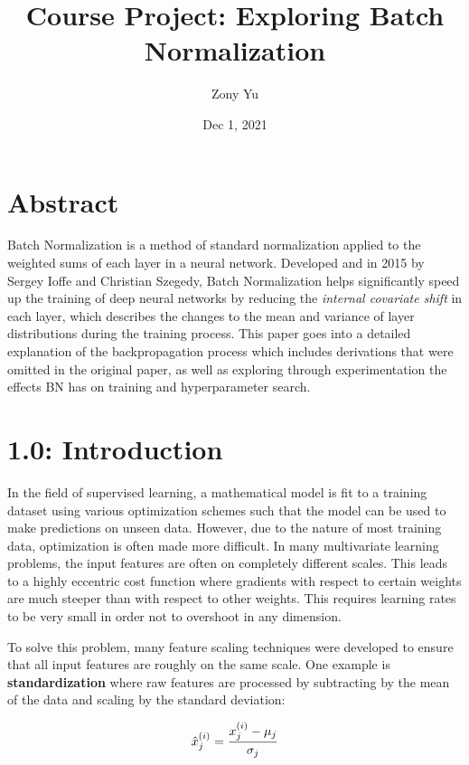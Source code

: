 \documentclass{article}
\title{Course Project: Exploring Batch Normalization}
\author{Zony Yu}
\date{Dec 1, 2021}
\begin{document}
\maketitle

\begin{multicols}{2}






\section*{Abstract}

Batch Normalization is a method of standard normalization applied to the 
weighted sums of each layer in a neural network. Developed and in 2015 by 
Sergey Ioffe and Christian Szegedy, Batch Normalization
helps significantly speed up the training of deep neural networks by reducing the 
\textit{internal covariate shift} in each layer, which describes the 
changes to the mean and variance of layer distributions during the training process. This
paper goes into a detailed explanation of the backpropagation process which includes
derivations that were omitted in the original paper, as well as exploring through 
experimentation the effects BN has on training and hyperparameter search.


\section*{1.0: Introduction}
In the field of supervised learning, a mathematical model is fit to 
a training dataset using various optimization schemes such that the model 
can be used to make predictions on unseen data. However, 
due to the nature of most training data, optimization is often made more 
difficult. In many multivariate learning problems, the input features are
often on completely different scales. This leads to a highly eccentric cost
function where gradients with respect to certain weights are much steeper
than with respect to other weights. This requires learning rates to 
be very small in order not to overshoot in any dimension.

To solve this problem, many feature scaling techniques were developed to ensure
that all input features are roughly on the same scale. One example is \textbf{standardization}
where raw features are processed by subtracting by the mean of the data and 
scaling by the standard deviation:

\begin{equation}
    \hat{x}_j^{(i)} = {x^{(i)}_j - \mu_j \over \sigma_j} \notag
\end{equation}


\end{multicols}
\end{document}
